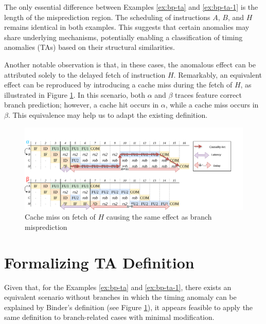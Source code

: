 The only essential difference between Examples \ref{ex:bp-ta} and \ref{ex:bp-ta-1} is the length of the misprediction region. The scheduling of instructions $A$, $B$, and $H$ remains identical in both examples. This suggests that certain anomalies may share underlying mechanisms, potentially enabling a classification of timing anomalies (TAs) based on their structural similarities.

Another notable observation is that, in these cases, the anomalous effect can be attributed solely to the delayed fetch of instruction $H$. Remarkably, an equivalent effect can be reproduced by introducing a cache miss during the fetch of $H$, as illustrated in Figure \ref{fig:equiv-to-bp-ta}. In this scenario, both $\alpha$ and $\beta$ traces feature correct branch prediction; however, a cache hit occurs in $\alpha$, while a cache miss occurs in $\beta$. This equivalence may help us to adapt the existing definition.


\begin{figure}[H]
    \centering
    \includegraphics[width=\textwidth]{figures/equiv-trace.png}
    \caption{Cache miss on fetch of $H$ causing the same effect as branch misprediction}
    \label{fig:equiv-to-bp-ta}
\end{figure}

\section{Formalizing TA Definition}


Given that, for the Examples \ref{ex:bp-ta} and \ref{ex:bp-ta-1}, there exists an equivalent scenario without branches in which the timing anomaly can be explained by Binder's definition (see Figure \ref{fig:equiv-to-bp-ta}), it appears feasible to apply the same definition to branch-related cases with minimal modification.


